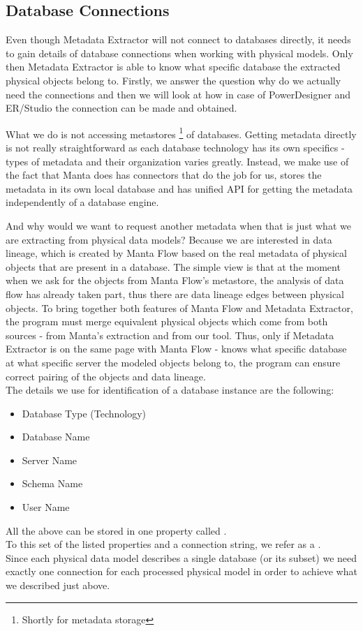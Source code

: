 \subsection{Database Connections}

Even though Metadata Extractor will not connect to databases directly, it needs to gain details of database connections when working with physical models.
Only then Metadata Extractor is able to know what specific database the extracted physical objects belong to. Firstly, we answer the question why do we actually need the connections and then we will look at how in case of PowerDesigner and ER/Studio the connection can be made and obtained.

What we do is not accessing metastores \footnote{Shortly for metadata storage} of databases. Getting metadata directly is not really straightforward as each database technology has its own specifics - types of metadata and their organization varies greatly. 
Instead, we make use of the fact that Manta does has connectors that do the job for us, stores the metadata in its own local database and has unified API for getting the metadata independently of a database engine. 

And why would we want to request another metadata when that is just what we are extracting from physical data models? \label{matching_physical_objects}
Because we are interested in data lineage, which is created by Manta Flow based on the real metadata of physical objects that are present in a database.
The simple view is that at the moment when we ask for the objects from Manta Flow's metastore, the analysis of data flow has already taken part, thus there are data lineage edges between physical objects. To bring together both features of Manta Flow and Metadata Extractor, the program must merge equivalent physical objects which come from both sources - from Manta's extraction and from our tool.
Thus, only if Metadata Extractor is on the same page with Manta Flow - knows what specific database at what specific server the modeled objects belong to, the program can ensure correct pairing of the objects and data lineage. \\

The details we use for identification of a database instance are the following:
\begin{itemize}
	\item Database Type (Technology)
	\item Database Name
	\item Server Name
	\item Schema Name
	\item User Name
\end{itemize} 
All the above can be stored in one property called .\\
To this set of the listed properties and a connection string, we refer as a . \\
Since each physical data model describes a single database (or its subset) we need exactly one connection for each processed physical model in order to achieve what we described just above.

